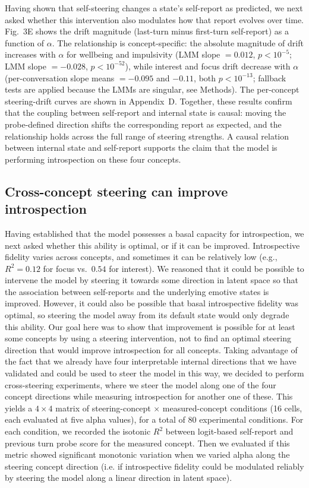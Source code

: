 \documentclass[10pt]{article}
\begin{document}
Having shown that self-steering changes a state's self-report as predicted, we next asked whether this intervention also modulates how that report evolves over time.
Fig.~3E shows the drift magnitude (last-turn minus first-turn self-report) as a function of $\alpha$.
The relationship is concept-specific: the absolute magnitude of drift increases with $\alpha$ for wellbeing and impulsivity (LMM slope $= 0.012$, $p < 10^{-5}$; LMM slope $= -0.028$, $p < 10^{-52}$), while interest and focus drift decrease with $\alpha$ (per-conversation slope means $= -0.095$ and $-0.11$, both $p < 10^{-13}$; fallback tests are applied because the LMMs are singular, see Methods).
The per-concept steering-drift curves are shown in Appendix~D.
Together, these results confirm that the coupling between self-report and internal state is causal: moving the probe-defined direction shifts the corresponding report as expected, and the relationship holds across the full range of steering strengths. A causal relation between internal state and self-report supports the claim that the model is performing introspection on these four concepts.

\subsection{Cross-concept steering can improve introspection}
\label{sec:results-cross}

Having established that the model possesses a basal capacity for introspection, we next asked whether this ability is optimal, or if it can be improved.
Introspective fidelity varies across concepts, and sometimes it can be relatively low (e.g., $R^2 = 0.12$ for focus vs.\ $0.54$ for interest). We reasoned that it could be possible to intervene the model by steering it towards some direction in latent space so that the association between self-reports and the underlying emotive states is improved. However, it could also be possible that basal introspective fidelity was optimal, so steering the model away from its default state would only degrade this ability.
Our goal here was to show that improvement is possible for at least some concepts by using a steering intervention, not to find an optimal steering direction that would improve introspection for all concepts. Taking advantage of the fact that we already have four interpretable internal directions that we have validated and could be used to steer the model in this way, we decided to perform cross-steering experiments, where we steer the model along one of the four concept directions while measuring introspection for another one of these.
This yields a $4 \times 4$ matrix of steering-concept $\times$ measured-concept conditions (16 cells, each evaluated at five alpha values), for a total of 80 experimental conditions. For each condition, we recorded the isotonic $R^2$ between logit-based self-report and previous turn probe score for the measured concept. Then we evaluated if this metric showed significant monotonic variation when we varied alpha along the steering concept direction (i.e. if introspective fidelity could be modulated reliably by steering the model along a linear direction in latent space).
\end{document}
